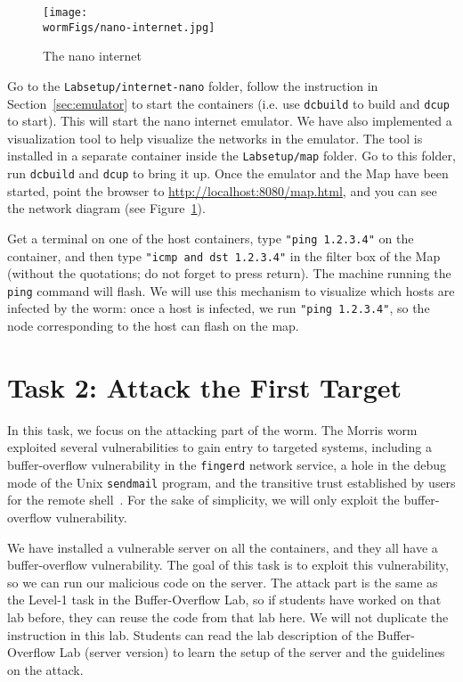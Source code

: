 \begin{figure}[htb]
  \begin{center}
    \texttt{[image: \\wormFigs/nano-internet.jpg]}
  \end{center}
  \caption{The nano internet}
  \label{fig:nano-internet}
\end{figure}
 

Go to the \texttt{Labsetup/internet-nano} folder, 
follow the instruction in Section~\ref{sec:emulator} to 
start the containers (i.e. use \texttt{dcbuild} to build and 
\texttt{dcup} to start). This will start the nano internet
emulator. We have also implemented a visualization tool
to help visualize the networks in the emulator. The tool
is installed in a separate container inside the 
\texttt{Labsetup/map} folder.  
Go to this folder, run \texttt{dcbuild} and \texttt{dcup}
to bring it up.
Once the emulator and the Map have been started, 
point the browser to \url{http://localhost:8080/map.html}, and 
you can see the network diagram (see Figure~\ref{fig:nano-internet}). 

Get a terminal on one of the host containers, 
type \texttt{"ping 1.2.3.4"} on the container, 
and then type \texttt{"icmp and dst 1.2.3.4"} in the 
filter box of the Map (without the quotations; 
do not forget to press return). 
The machine running the \texttt{ping} command will flash.  
We will use this mechanism to visualize which hosts
are infected by the worm: once a host is infected, we run
\texttt{"ping 1.2.3.4"}, so the node corresponding to the 
host can flash on the map. 



\section{Task 2: Attack the First Target} 


In this task, we focus on the attacking part of the worm. 
The Morris worm exploited several vulnerabilities to gain entry to targeted systems, 
including a buffer-overflow vulnerability in the \texttt{fingerd} 
network service, a hole in the debug mode of the 
Unix \texttt{sendmail} program, and the transitive trust established 
by users for the remote shell~\cite{wiki:worm,spafford:worm}.
For the sake of simplicity, we will only exploit the 
buffer-overflow vulnerability. 

We have installed a vulnerable server on all the containers, and they
all have a buffer-overflow vulnerability. 
The goal of this task is to exploit this vulnerability, 
so we can run our malicious code on the server. 
The attack part is the same as the Level-1 task in the 
Buffer-Overflow Lab, so if students have worked on that lab before, they can
reuse the code from that lab here. 
We will not duplicate the instruction in this lab. Students can read
the lab description of the Buffer-Overflow Lab (server version) to 
learn the setup of the server and the guidelines on the attack. 


